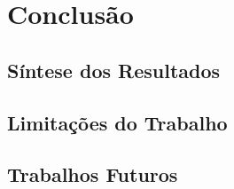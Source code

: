 \documentclass[12pt]{article}
\begin{document}
\section{Conclusão}
\label{sec:conclusao}

\subsection{Síntese dos Resultados}

\subsection{Limitações do Trabalho}

\subsection{Trabalhos Futuros}


\printbibliography[title={REFERÊNCIAS}]
\end{document}
